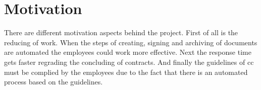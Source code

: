  \section{Motivation}
 There are different motivation aspects behind the project. First of all is the reducing of work. When the steps of creating, signing and archiving of documents are automated the employees could work more effective. Next the response time gets faster regrading the concluding of contracts. And finally the guidelines of \gls{cc} must be complied by the employees due to the fact that there is an automated process based on the guidelines. 